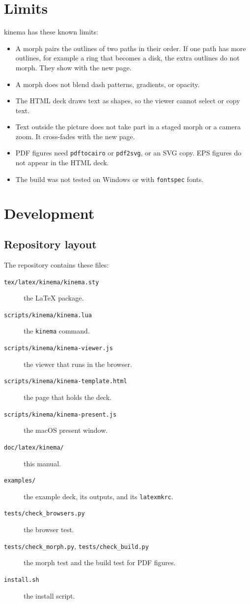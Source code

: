 \documentclass[11pt]{article}
\newcommand{\pkg}{\textsf{kinema}}
\newcommand{\cmd}[1]{\texttt{#1}}
\begin{document}
\section{Limits}

\pkg{} has these known limits:
\begin{itemize}
	\item A morph pairs the outlines of two paths in their order. If one path has
	      more outlines, for example a ring that becomes a disk, the extra outlines do
	      not morph. They show with the new page.
	\item A morph does not blend dash patterns, gradients, or opacity.
	\item The HTML deck draws text as shapes, so the viewer cannot select or copy
	      text.
	\item Text outside the picture does not take part in a staged morph or a camera
	      zoom. It cross-fades with the new page.
	\item PDF figures need \cmd{pdftocairo} or \cmd{pdf2svg}, or an SVG copy. EPS figures do not appear in the HTML deck.
	\item The build was not tested on Windows or with \cmd{fontspec} fonts.
\end{itemize}

\section{Development}

\subsection{Repository layout}

The repository contains these files:
\begin{description}
	\item[\cmd{tex/latex/kinema/kinema.sty}] the LaTeX package.
	\item[\cmd{scripts/kinema/kinema.lua}] the \cmd{kinema} command.
	\item[\cmd{scripts/kinema/kinema-viewer.js}] the viewer that runs in the browser.
	\item[\cmd{scripts/kinema/kinema-template.html}] the page that holds the deck.
	\item[\cmd{scripts/kinema/kinema-present.js}] the macOS present window.
	\item[\cmd{doc/latex/kinema/}] this manual.
	\item[\cmd{examples/}] the example deck, its outputs, and its \cmd{latexmkrc}.
	\item[\cmd{tests/check\_browsers.py}] the browser test.
	\item[\cmd{tests/check\_morph.py}, \cmd{tests/check\_build.py}] the morph test and the build test for PDF figures.
	\item[\cmd{install.sh}] the install script.
\end{description}
\end{document}
